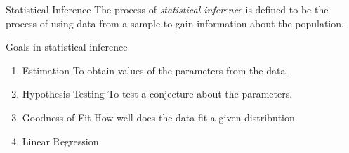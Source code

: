 \begin{df}{Statistical Inference}
	The process of \textit{statistical inference} is defined to be the process of using data from a sample to gain information about the population.	
\end{df}
\begin{eg}
	Goals in statistical inference
	\begin{enumerate}
		\item \begin{df}{Estimation} To obtain values of the parameters from the data. \end{df}
		\item \begin{df}{Hypothesis Testing} To test a conjecture about the parameters. \end{df}
		\item \begin{df}{Goodness of Fit} How well does the data fit a given distribution. \end{df}
		\item Linear Regression
	\end{enumerate}	
\end{eg}


